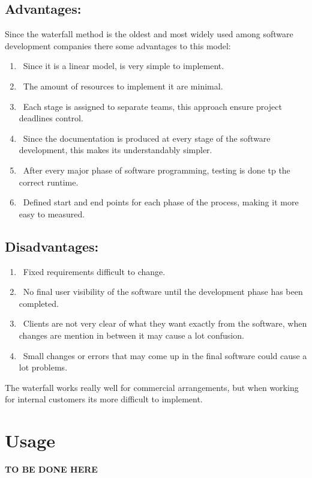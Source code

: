 \subsection*{Advantages:} Since the waterfall method is the oldest and most widely used among software development companies there some advantages to this model:
\begin{enumerate}
	\item\ Since it is a linear model, is very simple to implement.
	\item\ The amount of resources to implement it are minimal.
	\item\ Each stage is assigned to separate teams, this approach ensure project deadlines control.
	\item\ Since the documentation is produced at every stage of the software development, this makes its understandably simpler.
	\item\ After every major phase of software programming, testing is done tp the correct runtime.
	\item\ Defined start and end points for each phase of the process, making it more easy to measured. 
\end{enumerate}

\subsection*{Disadvantages:} 
\begin{enumerate}
	\item\ Fixed requirements difficult to change.
	\item\ No final user visibility of the software until the development phase has been completed.
	\item\ Clients are not very clear of what they want exactly from the software, when changes are mention in between it may cause a lot confusion.
	\item\ Small changes or errors that may come up in the final software could cause a lot problems.
\end{enumerate}

The waterfall works really well for commercial arrangements, but when working for internal customers its more difficult to implement.

\section*{Usage}
\textbf{TO BE DONE HERE}


